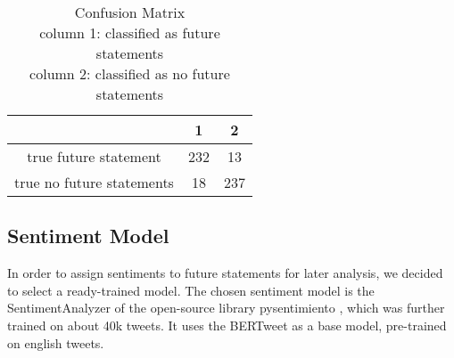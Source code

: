 \begin{table}
\small
\captionsetup{size=footnotesize}
\begin{tabular}{
    c|cc}
\hline
& 1 & 2\\
\hline
true future statement & 232 & 13 \\
true no future statements & 18 & 237 \\
\hline
\end{tabular}
\caption{\label{cm}
Confusion Matrix\\
column 1: classified as future statements\\
column 2: classified as no future statements
}
\end{table}

\subsection{Sentiment Model}
In order to assign sentiments to future statements for later analysis, we decided to select a ready-trained model.
The chosen sentiment model is the SentimentAnalyzer of the open-source library pysentimiento \citep{perez2021pysentimiento}, which was further trained on about 40k tweets.
It uses the BERTweet \citep{bertweet} as a base model, pre-trained on english tweets.

